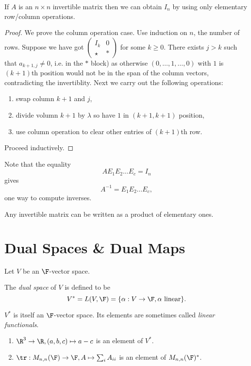 \documentclass[a4paper]{article}
\theoremstyle{definition}
\begin{document}
\begin{lem}
  If \(A\) is an \(n\times n\) invertible matrix then we can obtain \(I_n\) by using only elementary row/column operations.
\end{lem}

\begin{proof}
  We prove the column operation case. Use induction on \(n\), the number of rows. Suppose we have got \(\begin{pmatrix} I_k & 0 \\ \star & \ast \end{pmatrix}\) for some \(k\geq 0\). There exists \(j>k\) such that \(a_{k+1,j}\neq 0\), i.e. in the \(\ast\) block) as otherwise \((0,\dots,1,\dots, 0)\) with \(1\) is \((k+1)\)th position would not be in the span of the column vectors, contradicting the invertiblity. Next we carry out the following operations:
  \begin{enumerate}
  \item swap column \(k+1\) and \(j\),
  \item divide volumn \(k+1\) by \(\lambda\) so have \(1\) in \((k+1,k+1)\) position,
  \item use column operation to clear other entries of \((k+1)\)th row.
  \end{enumerate}
  Proceed inductively.
\end{proof}

Note that the equality
\[
  AE_1E_2\dots E_c = I_n
\]
gives
\[
  A^{-1} = E_1E_2\dots E_c,
\]
one way to compute inverses.

\begin{prop}
  Any invertible matrix can be written as a product of elementary ones.
\end{prop}

\section{Dual Spaces \& Dual Maps}

Let \(V\) be an \(\F\)-vector space.

\begin{defi}
  The \emph{dual space} of \(V\) is defined to be
  \[
    V^* = L(V,\F) = \{\alpha:V\to \F, \alpha \text{ linear}\}.
  \]
\end{defi}

\(V^*\) is itself an \(\F\)-vector space. Its elements are sometimes called \emph{linear functionals}.

\begin{eg}\leavevmode
  \begin{enumerate}
  \item \(\R^3 \to \R, (a,b,c)\mapsto a-c\) is an element of \(V^*\).
  \item \(\tr: M_{n,n}(\F)\to \F, A\mapsto \sum_i A_{ii}\) is an element of \(M_{n,n}(\F)^*\).
  \end{enumerate}
\end{eg}
\end{document}
